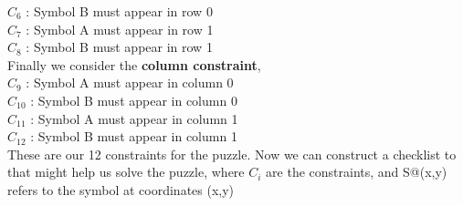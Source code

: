 \documentclass{article}
\begin{document}
$C_6$ :  Symbol B must appear in row 0\\
$C_7$ :  Symbol A must appear in row 1\\
$C_8$ :  Symbol B must appear in row 1\\
Finally we consider the \textbf{column constraint},\\
$C_9$ :  Symbol A must appear in column 0\\
$C_{10}$ :  Symbol B must appear in column 0\\
$C_{11}$ :  Symbol A must appear in column 1\\
$C_{12}$ :  Symbol B must appear in column 1\\
These are our 12 constraints for the puzzle. Now we can construct a checklist to that might help us solve the puzzle, where $C_i$ are the constraints, and S@(x,y) refers to the symbol at coordinates (x,y)\\\\
\renewcommand{\arraystretch}{2.5}
\end{document}
